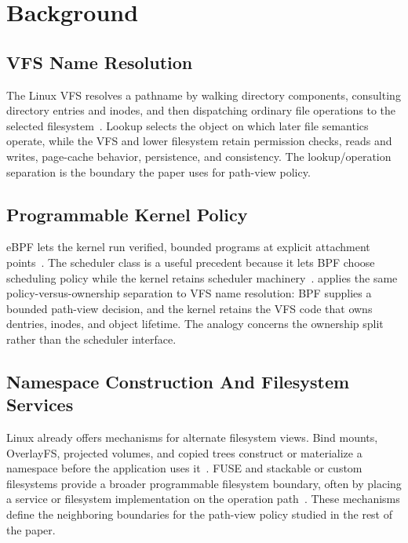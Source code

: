 \section{Background}
\label{sec:background}

\subsection{VFS Name Resolution}

The Linux VFS resolves a pathname by walking directory components, consulting
directory entries and inodes, and then dispatching ordinary file operations to
the selected filesystem~\cite{linux_vfs_docs,linux_path_lookup}. Lookup selects
the object on which later file semantics operate, while the VFS and lower
filesystem retain permission checks, reads and writes, page-cache behavior,
persistence, and consistency. The lookup/operation separation is the boundary
the paper uses for path-view policy.

\subsection{Programmable Kernel Policy}

eBPF lets the kernel run verified, bounded programs at explicit attachment
points~\cite{linux_bpf_docs,linux_bpf_verifier}. The  scheduler
class is a useful precedent because it lets BPF choose scheduling policy while
the kernel retains scheduler machinery~\cite{linux_sched_ext}. \namei applies
the same policy-versus-ownership separation to VFS name resolution: BPF supplies
a bounded path-view decision, and the kernel retains the VFS code that owns
dentries, inodes, and object lifetime. The analogy concerns the ownership split
rather than the scheduler interface.

\subsection{Namespace Construction And Filesystem Services}

Linux already offers mechanisms for alternate filesystem views. Bind mounts,
OverlayFS, projected volumes, and copied trees construct or materialize a
namespace before the application uses it~\cite{linux_mount,linux_overlayfs,kubernetes_projected_volumes}.
FUSE and stackable or custom filesystems provide a broader programmable
filesystem boundary, often by placing a service or filesystem implementation on
the operation path~\cite{linux_fuse,wrapfs,bento}. These mechanisms define the neighboring
boundaries for the path-view policy studied in the rest of the paper.
